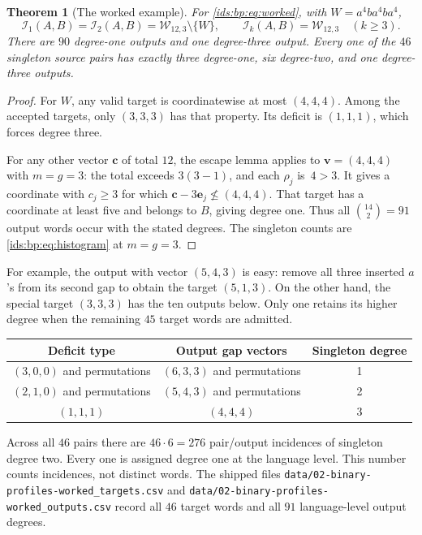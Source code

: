 \documentclass[11pt,letterpaper]{article}
\newtheorem{theorem}{Theorem}[section]
\theoremstyle{definition}\newtheorem{definition}[theorem]{Definition}
\theoremstyle{remark}\newtheorem{remark}[theorem]{Remark}
\theoremstyle{definition}\newtheorem{question}[theorem]{Question}
\newcommand{\ins}[3]{\mathcal I_{#1}(#2,#3)}
\newcommand{\bpW}[2]{\mathcal W_{#1,#2}}
\begin{document}
\begin{theorem}[The worked example]
\label{ids:bp:thm:example}
For \eqref{ids:bp:eq:worked}, with $W=a^4ba^4ba^4$,
\[
 \ins{1}{A}{B}=\ins{2}{A}{B}=\bpW{12}{3}\setminus\{W\},
 \qquad \ins{k}{A}{B}=\bpW{12}{3}\quad(k\geq3).
\]
There are $90$ degree-one outputs and one degree-three output. Every one of
the $46$ singleton source pairs has exactly three degree-one, six degree-two,
and one degree-three outputs.
\end{theorem}
\begin{proof}
For $W$, any valid target is coordinatewise at most $(4,4,4)$. Among the
accepted targets, only $(3,3,3)$ has that property. Its deficit is $(1,1,1)$,
which forces degree three.

For any other vector $\mathbf c$ of total $12$, the escape lemma applies to
$\mathbf v=(4,4,4)$ with $m=g=3$: the total exceeds $3(3-1)$, and each
$\rho_j$ is~$4>3$. It gives a coordinate with $c_j\geq3$ for which
$\mathbf c-3\mathbf e_j\not\leq(4,4,4)$. That target has a coordinate at
least five and belongs to $B$, giving degree one. Thus all
$\binom{14}{2}=91$ output words occur with the stated degrees.
The singleton counts are \eqref{ids:bp:eq:histogram} at $m=g=3$.
\end{proof}

For example, the output with vector $(5,4,3)$ is easy: remove all three
inserted $a$'s from its second gap to obtain the target $(5,1,3)$. On the
other hand, the special target $(3,3,3)$ has the ten outputs below. Only one
retains its higher degree when the remaining $45$ target words are admitted.
\begin{center}
\begin{tabular}{@{}ccc@{}}
\toprule
Deficit type & Output gap vectors & Singleton degree\\
\midrule
$(3,0,0)$ and permutations & $(6,3,3)$ and permutations & 1\\
$(2,1,0)$ and permutations & $(5,4,3)$ and permutations & 2\\
$(1,1,1)$ & $(4,4,4)$ & 3\\
\bottomrule
\end{tabular}
\end{center}
Across all $46$ pairs there are $46\cdot6=276$ pair/output incidences of
singleton degree two. Every one is assigned degree one at the language
level. This number counts incidences, not distinct words. The shipped files
\nolinkurl{data/02-binary-profiles-worked_targets.csv} and
\nolinkurl{data/02-binary-profiles-worked_outputs.csv} record all $46$ target
words and all $91$ language-level output degrees.
\end{document}
